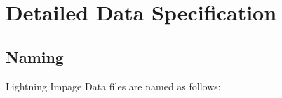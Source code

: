 \documentclass[a4paper,10pt,bibtotoc]{scrartcl}
\begin{document}



\clearpage

\section{Detailed Data Specification}
\label{sec:detailed structure}



\subsection{Naming}
Lightning Impage Data files are named as follows:\\\,\\

\end{document}

